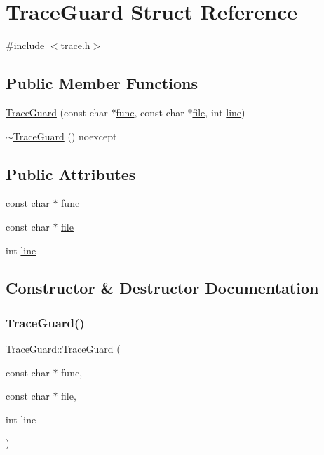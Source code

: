 \hypertarget{struct_trace_guard}{}\section{Trace\+Guard Struct Reference}
\label{struct_trace_guard}


{\ttfamily \#include $<$trace.\+h$>$}

\subsection*{Public Member Functions}
\begin{DoxyCompactItemize}
\item 
\hyperlink{struct_trace_guard_a60c8981a355aa5596eea32e1de2848cd}{Trace\+Guard} (const char $\ast$\hyperlink{struct_trace_guard_a97f3698b1e93174f750b87e80ae9d7d5}{func}, const char $\ast$\hyperlink{struct_trace_guard_a9629dd2d4daa8cf6858ac79002b58930}{file}, int \hyperlink{struct_trace_guard_a47010bc1461b9bcc153b75a36ab01feb}{line})
\item 
\hyperlink{struct_trace_guard_a0b8afa7299b57caff329144176986288}{$\sim$\+Trace\+Guard} () noexcept
\end{DoxyCompactItemize}
\subsection*{Public Attributes}
\begin{DoxyCompactItemize}
\item 
const char $\ast$ \hyperlink{struct_trace_guard_a97f3698b1e93174f750b87e80ae9d7d5}{func}
\item 
const char $\ast$ \hyperlink{struct_trace_guard_a9629dd2d4daa8cf6858ac79002b58930}{file}
\item 
int \hyperlink{struct_trace_guard_a47010bc1461b9bcc153b75a36ab01feb}{line}
\end{DoxyCompactItemize}


\subsection{Constructor \& Destructor Documentation}
\mbox{\label{struct_trace_guard_a60c8981a355aa5596eea32e1de2848cd}} 
\subsubsection{\texorpdfstring{Trace\+Guard()}{TraceGuard()}}
{\footnotesize\ttfamily Trace\+Guard\+::\+Trace\+Guard (\begin{DoxyParamCaption}\item[{const char $\ast$}]{func,  }\item[{const char $\ast$}]{file,  }\item[{int}]{line }\end{DoxyParamCaption})}

